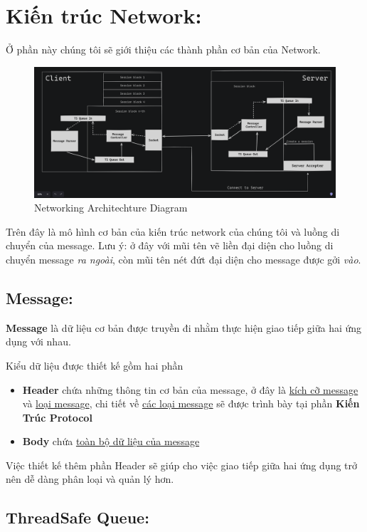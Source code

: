 \section{Kiến trúc Network: }
Ở phần này chúng tôi sẽ giới thiệu các thành phần cơ bản của Network. \\

\begin{figure}[H]
	\centering
	\includegraphics[width=\linewidth]{latex/architechture/architechture_diagram.png}
	\caption{Networking Architechture Diagram}
	\label{fig:network}
\end{figure}

Trên đây là mô hình cơ bản của kiến trúc network của chúng tôi và luồng di chuyển của message. Lưu ý: ở đây với mũi tên vẽ liền đại diện cho luồng di chuyển message \textit{ra ngoài}, còn mũi tên nét đứt đại diện cho message được gởi \textit{vào}.

\subsection{Message: }
\textbf{Message} là dữ liệu cơ bản được truyền đi nhằm thực hiện giao tiếp giữa hai ứng dụng với nhau.

Kiểu dữ liệu được thiết kế gồm hai phần
\begin{itemize}
	\item \textbf{Header} chứa những thông tin cơ bản của message, ở đây là \underline{kích cỡ message} và \underline{loại message}, chi tiết về \underline{các loại message} sẽ được trình bày tại phần \textbf{Kiến Trúc Protocol}
	\item \textbf{Body} chứa \underline{toàn bộ dữ liệu của message}
\end{itemize}

Việc thiết kế thêm phần Header sẽ giúp cho việc giao tiếp giữa hai ứng dụng trở nên dễ dàng phân loại và quản lý hơn.

\subsection{ThreadSafe Queue: }


